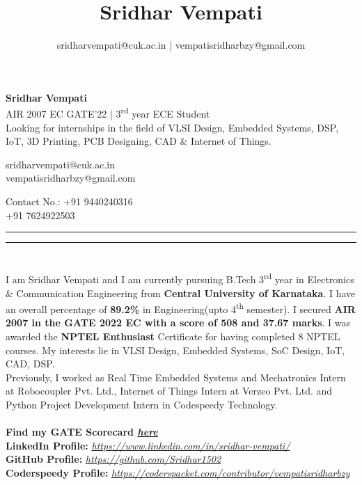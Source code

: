 \documentclass[]{article}
\title{Sridhar Vempati}
\author{sridharvempati@cuk.ac.in | vempatisridharbzy@gmail.com}
\begin{document}
    \begin{center}
        \Huge \textbf{Sridhar Vempati}\\
	   \large AIR 2007 EC GATE'22 \(|\) 3\textsuperscript{rd} year ECE Student \\
	   \large Looking for internships in the field of VLSI Design, Embedded Systems, DSP, IoT, 3D Printing, PCB Designing, CAD \& Internet of Things.
    \end{center}

    \begin{multicols}{2}[]
      \begin{flushleft}
	 sridharvempati@cuk.ac.in \\ vempatisridharbzy@gmail.com
      \end{flushleft}
      \begin{flushright}
	Contact No.: +91 9440240316\\
	+91 7624922503
        \end{flushright}
    \end{multicols}  
    
    \begin{spacing}{0.05} %
    \noindent
    \rule{\linewidth}{2pt}
    \rule{\linewidth}{1pt}  
    \end{spacing}

\section*{\color{blue}{Summary}}%
I am Sridhar Vempati and I am currently pursuing B.Tech 3\textsuperscript{rd} year in Electronics \& Communication Engineering from \textbf{Central University of Karnataka}. I have an overall percentage of \textbf{89.2\%} in Engineering(upto 4\textsuperscript{th} semester). I secured \textbf{AIR 2007 in the GATE 2022 EC with a score of 508 and 37.67 marks}. I was awarded the \textbf{NPTEL Enthusiast} Certificate for having completed 8 NPTEL courses. My interests lie in VLSI Design, Embedded Systems, SoC Design, IoT, CAD, DSP.\\Previously, I worked as Real Time Embedded Systems and Mechatronics Intern at Robocoupler Pvt. Ltd., Internet of Things Intern at Verzeo Pvt. Ltd. and Python Project Development Intern in Codespeedy Technology.\\\\
	\textbf {Find my GATE Scorecard \href{https://drive.google.com/drive/folders/11RDjP2MJ5MHqZlXpzrzX8gFm-TfcGO2r?usp=sharing}{\em here}}\\
     \textbf{LinkedIn Profile: }{\em \url{https://www.linkedin.com/in/sridhar-vempati/}}\\
     \textbf{GitHub Profile: }{\em \url{https://github.com/Sridhar1502}}\\
	\textbf{Coderspeedy Profile: }{\em \url{https://coderspacket.com/contributor/vempatisridharbzy}}
\end{document}
